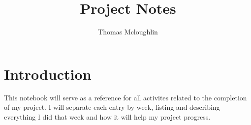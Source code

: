 \documentclass[12pt]{article}
\title{Project Notes}
\author{Thomas Mcloughlin}
\begin{document}
\maketitle

\section{Introduction}
This notebook will serve as a reference for all activites related to the completion
of my project. I will separate each entry by week, listing and describing everything
I did that week and how it will help my project progress.
\end{document}

